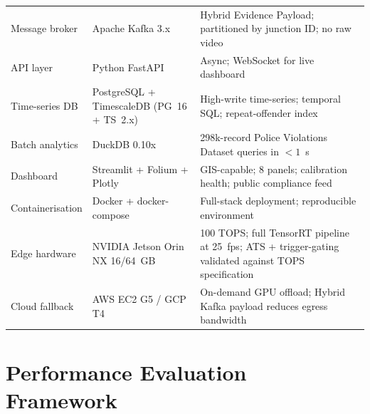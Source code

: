 \documentclass[11pt,a4paper]{article}
\begin{document}
\begin{longtable}{L{3.5cm} L{4.5cm} L{6.5cm}}
    Message broker & Apache Kafka 3.x & Hybrid Evidence Payload; partitioned by junction ID; no raw video \\
    API layer & Python FastAPI & Async; WebSocket for live dashboard \\
    Time-series DB & PostgreSQL + TimescaleDB (PG~16 + TS~2.x) & High-write time-series; temporal SQL; repeat-offender index \\
    Batch analytics & DuckDB 0.10x & 298k-record Police Violations Dataset queries in $< 1$~s \\
    Dashboard & Streamlit + Folium + Plotly & GIS-capable; 8 panels; calibration health; public compliance feed \\
    Containerisation & Docker + docker-compose & Full-stack deployment; reproducible environment \\
    Edge hardware & NVIDIA Jetson Orin NX 16/64~GB & 100 TOPS; full TensorRT pipeline at 25~fps; ATS + trigger-gating validated against TOPS specification \\
    Cloud fallback & AWS EC2 G5 / GCP T4 & On-demand GPU offload; Hybrid Kafka payload reduces egress bandwidth \\
\end{longtable}

\section{Performance Evaluation Framework}
\end{document}
